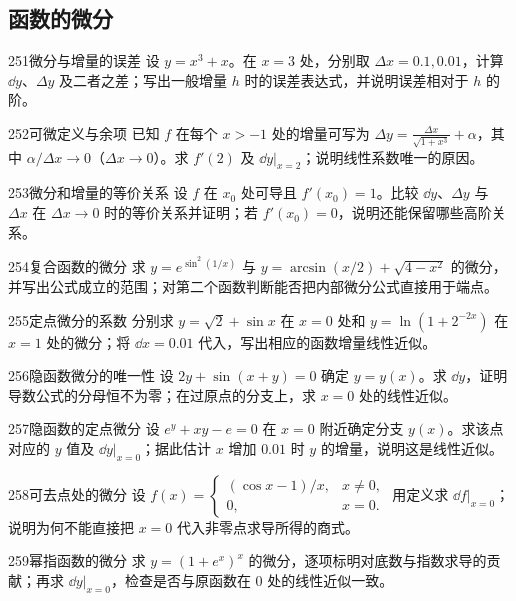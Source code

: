 \subsection{函数的微分}
\begin{exercise}{251}{微分与增量的误差}
设 $y=x^3+x$。在 $x=3$ 处，分别取 $\Delta x=0.1,0.01$，计算 $\dd y$、$\Delta y$ 及二者之差；写出一般增量 $h$ 时的误差表达式，并说明误差相对于 $h$ 的阶。
\end{exercise}
\begin{exercise}{252}{可微定义与余项}
已知 $f$ 在每个 $x>-1$ 处的增量可写为 $\Delta y=\frac{\Delta x}{\sqrt{1+x^3}}+\alpha$，其中 $\alpha/\Delta x\to0$（$\Delta x\to0$）。求 $f'(2)$ 及 $\dd y|_{x=2}$；说明线性系数唯一的原因。
\end{exercise}
\begin{exercise}{253}{微分和增量的等价关系}
设 $f$ 在 $x_0$ 处可导且 $f'(x_0)=1$。比较 $\dd y$、$\Delta y$ 与 $\Delta x$ 在 $\Delta x\to0$ 时的等价关系并证明；若 $f'(x_0)=0$，说明还能保留哪些高阶关系。
\end{exercise}
\begin{exercise}{254}{复合函数的微分}
求 $y=e^{\sin^2(1/x)}$ 与 $y=\arcsin(x/2)+\sqrt{4-x^2}$ 的微分，并写出公式成立的范围；对第二个函数判断能否把内部微分公式直接用于端点。
\end{exercise}
\begin{exercise}{255}{定点微分的系数}
分别求 $y=\sqrt2+\sin x$ 在 $x=0$ 处和 $y=\ln(1+2^{-2x})$ 在 $x=1$ 处的微分；将 $\dd x=0.01$ 代入，写出相应的函数增量线性近似。
\end{exercise}
\begin{exercise}{256}{隐函数微分的唯一性}
设 $2y+\sin(x+y)=0$ 确定 $y=y(x)$。求 $\dd y$，证明导数公式的分母恒不为零；在过原点的分支上，求 $x=0$ 处的线性近似。
\end{exercise}
\begin{exercise}{257}{隐函数的定点微分}
设 $e^y+xy-e=0$ 在 $x=0$ 附近确定分支 $y(x)$。求该点对应的 $y$ 值及 $\dd y|_{x=0}$；据此估计 $x$ 增加 $0.01$ 时 $y$ 的增量，说明这是线性近似。
\end{exercise}
\begin{exercise}{258}{可去点处的微分}
设 $f(x)=\begin{cases}(\cos x-1)/x,&x\ne0,\\0,&x=0.\end{cases}$ 用定义求 $\dd f|_{x=0}$；说明为何不能直接把 $x=0$ 代入非零点求导所得的商式。
\end{exercise}
\begin{exercise}{259}{幂指函数的微分}
求 $y=(1+e^x)^x$ 的微分，逐项标明对底数与指数求导的贡献；再求 $\dd y|_{x=0}$，检查是否与原函数在 $0$ 处的线性近似一致。
\end{exercise}
